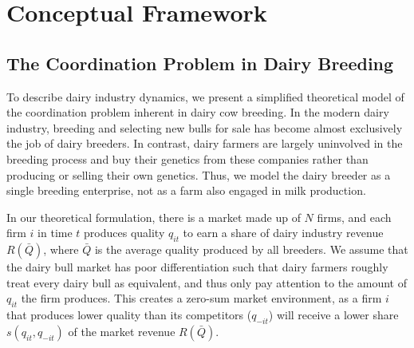 \documentclass[12pt,letterpaper]{article}
\begin{document}

\section{Conceptual Framework\label{sec:concept_frame}}

\subsection{The Coordination Problem in Dairy Breeding\label{subsec:coord_problem}}
To describe dairy industry dynamics, we present a simplified theoretical model of the coordination problem inherent in dairy cow breeding. In the modern dairy industry, breeding and selecting new bulls for sale has become almost exclusively the job of dairy breeders. In contrast, dairy farmers are largely uninvolved in the breeding process and buy their genetics from these companies rather than producing or selling their own genetics. Thus, we model the dairy breeder as a single breeding enterprise, not as a farm also engaged in milk production.

In our theoretical formulation, there is a market made up of $N$ firms, and each firm $i$ in time $t$ produces quality $q_{it}$ to earn a share of dairy industry revenue $R(\bar{Q})$, where $\bar{Q}$ is the average quality produced by all breeders. We assume that the dairy bull market has poor differentiation such that dairy farmers roughly treat every dairy bull as equivalent, and thus only pay attention to the amount of $q_{it}$ the firm produces.
This creates a zero-sum market environment, as a firm $i$ that produces lower quality than its competitors ($q_{-it}$) will receive a lower share $s(q_{it},q_{-it})$ of the market revenue $R(\bar{Q})$.
\end{document}
